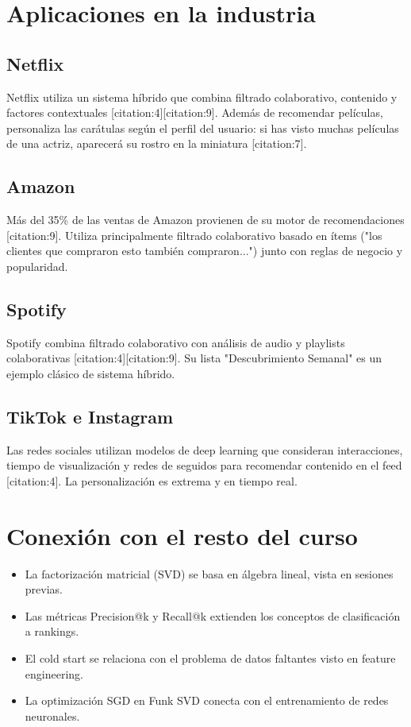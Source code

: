 \documentclass[12pt,a4paper,openany,oneside]{book}
\begin{document}
\section{Aplicaciones en la industria}

\subsection{Netflix}
Netflix utiliza un sistema híbrido que combina filtrado colaborativo, contenido y factores contextuales [citation:4][citation:9]. Además de recomendar películas, personaliza las carátulas según el perfil del usuario: si has visto muchas películas de una actriz, aparecerá su rostro en la miniatura [citation:7].

\subsection{Amazon}
Más del 35\% de las ventas de Amazon provienen de su motor de recomendaciones [citation:9]. Utiliza principalmente filtrado colaborativo basado en ítems ("los clientes que compraron esto también compraron...") junto con reglas de negocio y popularidad.

\subsection{Spotify}
Spotify combina filtrado colaborativo con análisis de audio y playlists colaborativas [citation:4][citation:9]. Su lista "Descubrimiento Semanal" es un ejemplo clásico de sistema híbrido.

\subsection{TikTok e Instagram}
Las redes sociales utilizan modelos de deep learning que consideran interacciones, tiempo de visualización y redes de seguidos para recomendar contenido en el feed [citation:4]. La personalización es extrema y en tiempo real.

\section{Conexión con el resto del curso}
\begin{itemize}
    \item La factorización matricial (SVD) se basa en álgebra lineal, vista en sesiones previas.
    \item Las métricas Precision@k y Recall@k extienden los conceptos de clasificación a rankings.
    \item El cold start se relaciona con el problema de datos faltantes visto en feature engineering.
    \item La optimización SGD en Funk SVD conecta con el entrenamiento de redes neuronales.
\end{itemize}
\end{document}
